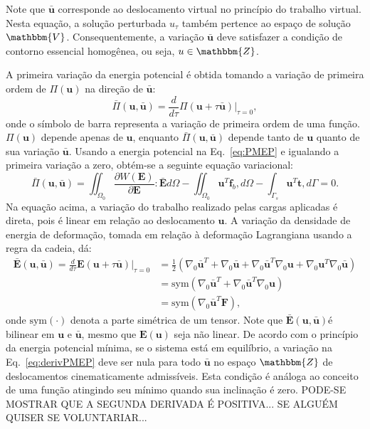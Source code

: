 Note que $\mathbf{\bar{u}}$ corresponde ao deslocamento virtual no princípio do trabalho virtual. Nesta equação, a solução perturbada $u_\tau$ também pertence ao espaço de solução $\mathbbm{V}$. Consequentemente, a variação $\mathbf{\bar{u}}$ deve satisfazer a condição de contorno essencial homogênea, ou seja, $u \in \mathbbm{Z}$.

A primeira variação da energia potencial é obtida tomando a variação de primeira ordem de $\Pi(\mathbf{u})$ na direção de $\mathbf{\bar{u}}$:
\begin{equation}\label{eq:derivPi}
	\bar{\Pi}(\mathbf{u}, \mathbf{\bar{u}}) = \frac{d}{d\tau} \Pi(\mathbf{u} + \tau \mathbf{\bar{u}}) \Big|_{\tau=0},
\end{equation}
onde o símbolo de barra representa a variação de primeira ordem de uma função. $\Pi(\mathbf{u})$ depende apenas de $\mathbf{u}$, enquanto $\bar{\Pi}(\mathbf{u}, \mathbf{\bar{u}})$ depende tanto de $\mathbf{u}$ quanto de sua variação $\mathbf{\bar{u}}$. Usando a energia potencial na Eq.~\eqref{eq:PMEP} e igualando a primeira variação a zero, obtém-se a seguinte equação variacional:
\begin{equation}\label{eq:derivPMEP}
	\bar{\Pi}(\mathbf{u}, \mathbf{\bar{u}}) = \iint_{\Omega_0} \frac{\partial W(\mathbf{E})}{\partial \mathbf{E}} : \mathbf{\bar{E}} d\Omega - \iint_{\Omega_0} \mathbf{u}^T \mathbf{f}_b , d\Omega - \int_{\Gamma_s} \mathbf{u}^T \mathbf{t} , d\Gamma = 0.
\end{equation}
Na equação acima, a variação do trabalho realizado pelas cargas aplicadas é direta, pois é linear em relação ao deslocamento $\mathbf{u}$. A variação da densidade de energia de deformação, tomada em relação à deformação Lagrangiana usando a regra da cadeia, dá:
\begin{equation}
	\begin{split}
		\mathbf{\bar{E}}(\mathbf{u}, \mathbf{\bar{u}}) = \frac{d}{d\tau} \mathbf{E}(\mathbf{u} + \tau \mathbf{\bar{u}}) \Big|_{\tau=0} &= \frac{1}{2} \left( \nabla_0 \mathbf{\bar{u}}^T + \nabla_0 \mathbf{\bar{u}} + \nabla_0 \mathbf{\bar{u}}^T \nabla_0 \mathbf{u}  + \nabla_0 \mathbf{u}^T \nabla_0 \mathbf{\bar{u}} \right) \\
		& =\text{sym}\left(\nabla_0\mathbf{\bar{u}}^T+ \nabla_0 \mathbf{\bar{u}}^T \nabla_0 \mathbf{u}\right)\\
		& =\text{sym}\left(\nabla_0\mathbf{\bar{u}}^T\mathbf{F}\right),
	\end{split}
\end{equation}
onde $\text{sym}(\cdot)$ denota a parte simétrica de um tensor. Note que $\mathbf{\bar{E}}(\mathbf{u}, \mathbf{\bar{u}})$é bilinear em $\mathbf{u}$ e $\mathbf{\bar{u}}$, mesmo que $\mathbf{E}(\mathbf{u})$ seja não linear. De acordo com o princípio da energia potencial mínima, se o sistema está em equilíbrio, a variação na Eq.~\eqref{eq:derivPMEP} deve ser nula para todo $\mathbf{\bar{u}}$ no espaço $\mathbbm{Z}$ de deslocamentos cinematicamente admissíveis. Esta condição é análoga ao conceito de uma função atingindo seu mínimo quando sua inclinação é zero. {\color{red}PODE-SE MOSTRAR QUE A SEGUNDA DERIVADA É POSITIVA... SE ALGUÉM QUISER SE VOLUNTARIAR...}

